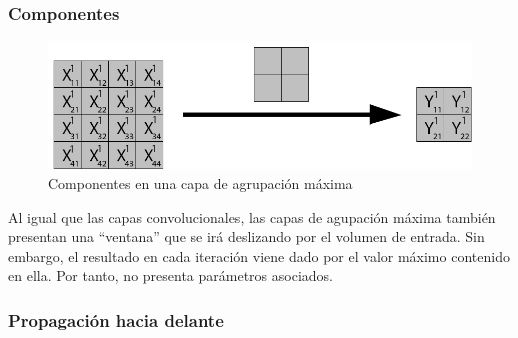 \subsubsection{Componentes}

\begin{figure}[H]
	\centering
	\includegraphics[scale=0.35]{imagenes/pool_nombres.jpg}  
	\caption{Componentes en una capa de agrupación máxima}
\end{figure}

Al igual que las capas convolucionales, las capas de agupación máxima también presentan una ``ventana'' que se irá deslizando por el volumen de entrada. Sin embargo, el resultado en cada iteración viene dado por el valor máximo contenido en ella. Por tanto, no presenta parámetros asociados.

\subsubsection{Propagación hacia delante}

